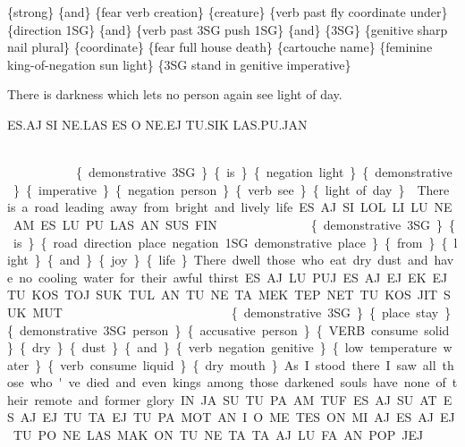{{\{strong\} \{and\} \{fear verb creation\} \{creature\} \{verb past fly coordinate under\} \{direction 1SG\} \{and\} \{verb past 3SG push 1SG\} \{and\} \{3SG\} \{genitive sharp nail plural\} \{coordinate\} \{fear full house death\} \{cartouche name\} \{feminine king-of-negation sun light\} \{3SG stand in genitive imperative\} 

 
 

There is darkness which lets no person again see light of day.  

 ES.AJ SI NE.LAS ES O NE.EJ TU.SIK LAS.PU.JAN 

\es\aj ~ \si ~ \Atlanne\la ~ \es ~ \Atlano ~ \Atlanne\ej ~ \tu\sik ~ \las\pu\jan

 \{demonstrative 3SG\} \{is\} \{negation light\} \{demonstrative\} \{imperative\} \{negation person\} \{verb see\} \{light of day\} 

\drie 
 

There is a road leading away from bright and lively life.  
 ES.AJ SI LOL.LI.LU.NE.AM.ES.LU PU LAS AN SUS FIN 

\es\aj ~ \si ~ \lol\li\lu\Atlanne\am\es\lu ~ \pu ~ \las ~ \an ~ \sus ~ \fin

\{demonstrative 3SG\} \{is\} \{road direction place negation 1SG demonstrative place\} \{from\} \{light\} \{and\} \{joy\} \{life\} 

 
 

There dwell those who eat dry dust and have no cooling water for their awful thirst.  
 ES.AJ LU.PUJ ES.AJ.EJ EK.EJ TU.KOS.TOJ SUK TUL AN TU.NE.TA MEK.TEP.NET TU.KOS.JIT SUK.MUT 

\es\aj ~ \lu\puj ~ \es\aj\ej ~ \ek\ek ~ \tu\kos\toj ~ \suk ~ \tul ~ \an ~ \tu\Atlanne\ta ~ \mek\tep\net ~ \tu\kos\jit ~ \suk\mut

\{demonstrative 3SG\} \{place stay\} \{demonstrative 3SG person\} \{accusative person\} \{VERB consume solid\} \{dry\} \{dust\} \{and\} \{verb negation genitive\} \{low temperature water\} \{verb consume liquid\} \{dry mouth\} 

 
 

 
 
As I stood there I saw all those who've died and even kings among those darkened souls have none of their remote and former glory. 

IN.JA SU TU.PA.AM.TUF ES.AJ SU AT ES.AJ.EJ TU.TA.EJ TU.PA.MOT AN I.O.ME TES.ON MI.AJ ES.AJ.EJ TU.PO.NE.LAS MAK.ON TU.NE.TA TA.AJ LU.FA AN POP JEJ 

\Atlanin\ja ~ \su ~ \tu\pa\am\tuf ~ \es\aj ~ \su ~ \at ~ \es\aj\ej ~ \\\tu\ta\ej ~ \tu\pa\mot ~ \an ~ \Atlani\Atlano\me ~ \\ ~ \tes\on ~ \mi\aj ~ \es\aj\ej ~ \tu\po\Atlanne\las ~ \mak\on ~ \\ ~ \tu\Atlanne\ta ~ \ta\taj ~ \lu\fa ~ \an ~ \pop ~ \jej


}}
